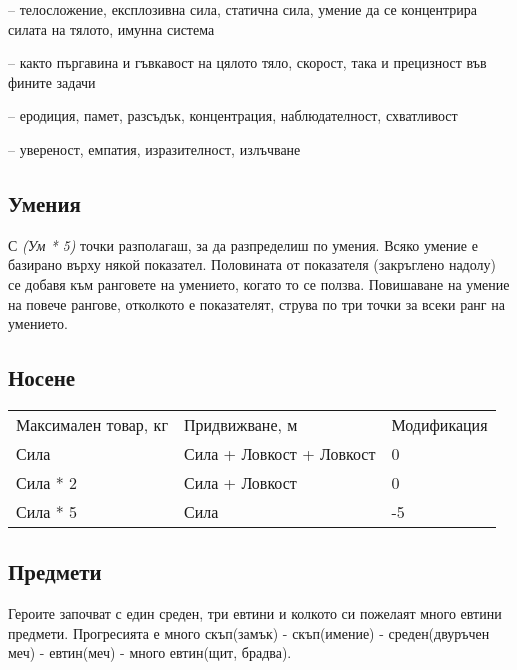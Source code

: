 \begin{itemize*}
\item {} – телосложение, експлозивна сила, статична сила, умение да се концентрира силата на тялото, имунна система
\item {} – както пъргавина и гъвкавост на цялото тяло, скорост, така и прецизност във фините задачи
\item {} – еродиция, памет, разсъдък, концентрация, наблюдателност, схватливост
\item {} – увереност, емпатия, изразителност, излъчване
\end{itemize*}

\subsection{Умения}
С \textit{(Ум * 5)} точки разполагаш, за да разпределиш по умения.
Всяко умение е базирано върху някой показател.
Половината от показателя (закръглено надолу) се добавя към ранговете на умението, когато то се ползва.
Повишаване на умение на повече рангове,  отколкото е показателят, струва по три точки за всеки ранг на умението.

\subsection{Носене}
\begin{tabular}{l | l | l }
Максимален товар, кг & Придвижване, м            & Модификация  \\
Сила                 & Сила + Ловкост + Ловкост  &  0           \\
Сила * 2             & Сила + Ловкост            &  0           \\
Сила * 5             & Сила                      & -5
\end{tabular}


\subsection{Предмети}
Героите започват с един среден, три евтини и колкото си пожелаят много евтини предмети.
Прогресията е много скъп(замък) - скъп(имение) - среден(двуръчен меч) - евтин(меч) - много евтин(щит, брадва).

